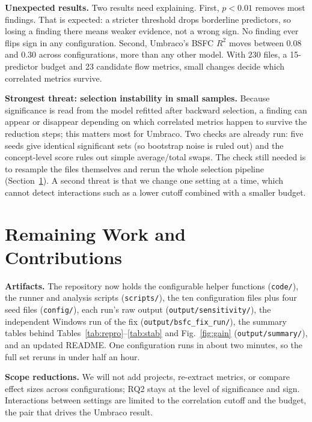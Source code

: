 \documentclass[conference]{IEEEtran}
\begin{document}
\textbf{Unexpected results.} Two results need explaining. First, $p<0.01$ removes most findings. That is expected: a stricter threshold drops borderline predictors, so losing a finding there means weaker evidence, not a wrong sign. No finding ever flips sign in any configuration. Second, Umbraco's BSFC $R^2$ moves between 0.08 and 0.30 across configurations, more than any other model. With 230 files, a 15-predictor budget and 23 candidate flow metrics, small changes decide which correlated metrics survive.

\textbf{Strongest threat: selection instability in small samples.} Because significance is read from the model refitted after backward selection, a finding can appear or disappear depending on which correlated metrics happen to survive the reduction steps; this matters most for Umbraco. Two checks are already run: five seeds give identical significant sets (so bootstrap noise is ruled out) and the concept-level score rules out simple average/total swaps. The check still needed is to resample the files themselves and rerun the whole selection pipeline (Section~\ref{sec:next}). A second threat is that we change one setting at a time, which cannot detect interactions such as a lower cutoff combined with a smaller budget.


\section{Remaining Work and Contributions}
\label{sec:next}
\textbf{Artifacts.} The repository now holds the configurable helper functions (\texttt{code/}), the runner and analysis scripts (\texttt{scripts/}), the ten configuration files plus four seed files (\texttt{config/}), each run's raw output (\texttt{output/sensitivity/}), the independent Windows run of the fix (\texttt{output/bsfc\_fix\_run/}), the summary tables behind Tables~\ref{tab:repro}--\ref{tab:stab} and Fig.~\ref{fig:gain} (\texttt{output/summary/}), and an updated README. One configuration runs in about two minutes, so the full set reruns in under half an hour.

\textbf{Scope reductions.} We will not add projects, re-extract metrics, or compare effect sizes across configurations; RQ2 stays at the level of significance and sign. Interactions between settings are limited to the correlation cutoff and the budget, the pair that drives the Umbraco result.
\end{document}
